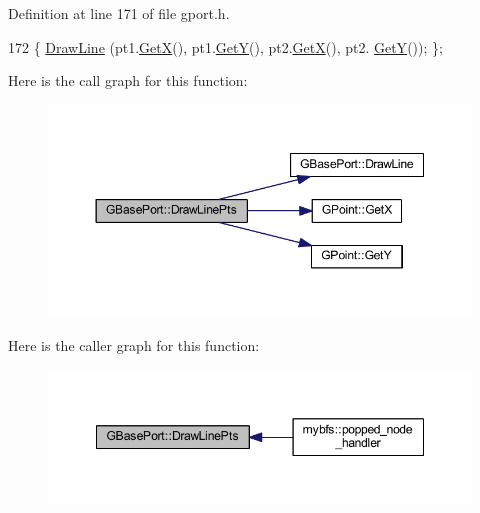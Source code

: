 Definition at line 171 of file gport.\+h.


\begin{DoxyCode}
172         \{ \mbox{\hyperlink{class_g_base_port_a9e19a5d97e629c3d19be31e1938504c1}{DrawLine}} (pt1.\mbox{\hyperlink{class_g_point_a1abafe0e52e3f7039bbe0c0acbb5a9a9}{GetX}}(), pt1.\mbox{\hyperlink{class_g_point_a0b40736448fc178ac2406875bd524a2c}{GetY}}(), pt2.\mbox{\hyperlink{class_g_point_a1abafe0e52e3f7039bbe0c0acbb5a9a9}{GetX}}(), pt2.
      \mbox{\hyperlink{class_g_point_a0b40736448fc178ac2406875bd524a2c}{GetY}}()); \};
\end{DoxyCode}
Here is the call graph for this function\+:
\nopagebreak
\begin{figure}[H]
\begin{center}
\leavevmode
\includegraphics[width=350pt]{class_g_base_port_ad176b1ff88c4c0a29d51869b13a288d2_cgraph}
\end{center}
\end{figure}
Here is the caller graph for this function\+:
\nopagebreak
\begin{figure}[H]
\begin{center}
\leavevmode
\includegraphics[width=348pt]{class_g_base_port_ad176b1ff88c4c0a29d51869b13a288d2_icgraph}
\end{center}
\end{figure}
\mbox{\label{class_s_v_g_port_a16219cfcb3520433a2c402c83b7ac47b}} 
